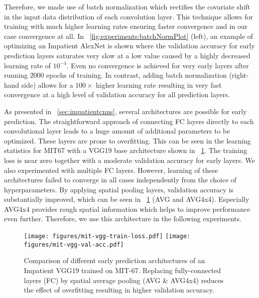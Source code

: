 \documentclass{bmvc2k}
\begin{document}
    Therefore, we made use of batch normalization \cite{ioffe2015batch} which rectifies the covariate shift in the input data distribution of each convolution layer.
    This technique allows for training with much higher learning rates ensuring faster convergence and in our case convergence at all.
    In \figurename~\ref{fig:experiments:batchNormPlot} (left), an example of optimizing an Impatient AlexNet is shown where the validation accuracy for early prediction layers saturates very slow at a low value caused by a highly decreased learning rate of $10^{-4}$.
    Even no convergence is achieved for very early layers after running 2000 epochs of training.
    In contrast, adding batch normalization (right-hand side) allows for a $100\times$ higher learning rate resulting in very fast convergence at a high level of validation accuracy for all prediction layers.


    As presented in \sectionname~\ref{sec:impatientcnns}, several architectures are possible for early prediction.
    The straightforward approach of connecting FC layers directly to each convolutional layer leads to a huge amount of additional parameters to be optimized.
    These layers are prone to overfitting.
    This can be seen in the learning statistics for MIT67 with a VGG19 base architecture shown in \figurename~\ref{fig:experiments:EPs}.
    The training loss is near zero together with a moderate validation accuracy for early layers.
    We also experimented with multiple FC layers.
    However, learning of these architectures failed to converge in all cases independently from the choice of hyperparameters.
    By applying spatial pooling layers, validation accuracy is substantially improved,
    which can be seen in \figurename~\ref{fig:experiments:EPs} (AVG and AVG4x4).
    Especially AVG4x4 provides rough spatial information which helps to improve performance even further. Therefore, we use this architecture in the following experiments.

    \begin{figure}[t]
        \centering
        \texttt{[image: figures/mit-vgg-train-loss.pdf]}
        \texttt{[image: figures/mit-vgg-val-acc.pdf]}
        \caption{Comparison of different early prediction architectures of an Impatient VGG19 trained on MIT-67.
            Replacing fully-connected layers (FC) by spatial average pooling (AVG \& AVG4x4) reduces the effect of overfitting resulting in higher validation accuracy.
        }
        \label{fig:experiments:EPs}
    \end{figure}
\end{document}
